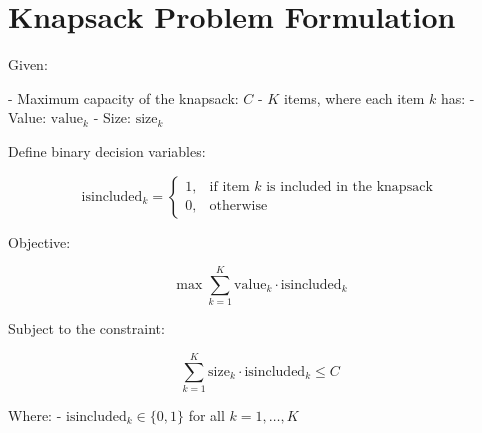 \documentclass{article}
\begin{document}
\section*{Knapsack Problem Formulation}

Given:

- Maximum capacity of the knapsack: \( C \)
- \( K \) items, where each item \( k \) has:
  - Value: \( \text{value}_k \)
  - Size: \( \text{size}_k \)

Define binary decision variables:

\[
\text{isincluded}_k = 
\begin{cases} 
1, & \text{if item } k \text{ is included in the knapsack} \\
0, & \text{otherwise}
\end{cases}
\]

Objective:

\[
\max \sum_{k=1}^{K} \text{value}_k \cdot \text{isincluded}_k
\]

Subject to the constraint:

\[
\sum_{k=1}^{K} \text{size}_k \cdot \text{isincluded}_k \leq C
\]

Where:
- \(\text{isincluded}_k \in \{0, 1\}\) for all \(k = 1, \ldots, K\)
\end{document}
